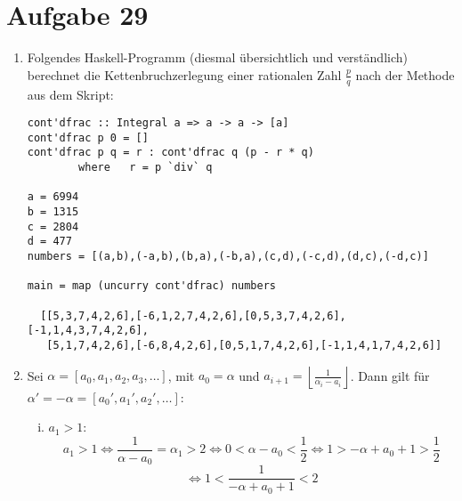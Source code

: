 \section*{Aufgabe 29}
\begin{enumerate}[(1)]
	\item
	Folgendes Haskell-Programm (diesmal übersichtlich und verständlich) berechnet
	die Kettenbruchzerlegung einer rationalen Zahl $\frac{p}{q}$ nach der Methode
	aus dem Skript:
	\lstset{language=Haskell}
	\begin{lstlisting}
cont'dfrac :: Integral a => a -> a -> [a]
cont'dfrac p 0 = []
cont'dfrac p q = r : cont'dfrac q (p - r * q)
        where   r = p `div` q 

a = 6994
b = 1315
c = 2804
d = 477
numbers = [(a,b),(-a,b),(b,a),(-b,a),(c,d),(-c,d),(d,c),(-d,c)]

main = map (uncurry cont'dfrac) numbers

  [[5,3,7,4,2,6],[-6,1,2,7,4,2,6],[0,5,3,7,4,2,6],[-1,1,4,3,7,4,2,6],
   [5,1,7,4,2,6],[-6,8,4,2,6],[0,5,1,7,4,2,6],[-1,1,4,1,7,4,2,6]]
	\end{lstlisting}
	\item Sei $\alpha = [a_0, a_1, a_2, a_3, \ldots]$, mit $a_0 = \alpha$
	und $a_{i+1} = \left\lfloor \frac{1}{\alpha_i - a_i} \right\rfloor $.
	Dann gilt für $\alpha' = -\alpha = [a_0', a_1', a_2', \ldots]$:
	\begin{enumerate}[(i)]
		\item $a_1 > 1$:
		\[ a_1 > 1  \Leftrightarrow \frac{1}{\alpha - a_0} = \alpha_1 > 2 
		\Leftrightarrow 0 < \alpha - a_0 < \frac{1}{2} 
		\Leftrightarrow 1 > -\alpha + a_0 + 1 > \frac{1}{2} \] 
		\[ \Leftrightarrow 1 < \frac{1}{-\alpha + a_0 + 1} < 2 \]


\end{enumerate}
\end{enumerate}
